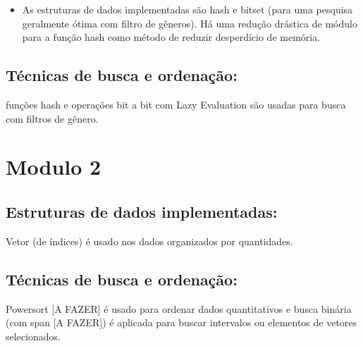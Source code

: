 \documentclass{article}
\begin{document}
	\begin{itemize}
		
		\item As estruturas de dados implementadas são hash e bitset (para uma pesquisa geralmente ótima com filtro de gêneros).  Há uma redução drástica de módulo para a função hash como método de reduzir desperdício de memória.

	\end{itemize}

\subsection{Técnicas de busca e ordenação: }
	
		funções hash e operações bit a bit com Lazy Evaluation são usadas para busca com filtros de gênero.

\section{Modulo 2}

\subsection{Estruturas de dados implementadas: }

		Vetor (de índices) é usado nos dados organizados por quantidades.

\subsection{Técnicas de busca e ordenação: }

	 	Powersort [A FAZER] é usado para ordenar dados quantitativos e busca binária (com span [A FAZER]) é aplicada para buscar intervalos ou elementos de vetores selecionados.
\end{document}
